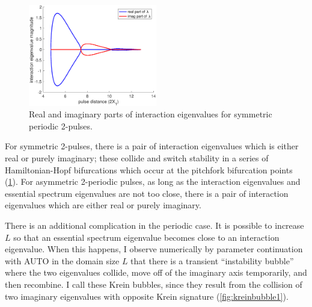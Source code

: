 \documentclass[12pt,reqno,oneside]{amsart}
\theoremstyle{definition}
\theoremstyle{remark}
\begin{document}
\begin{figure}
\includegraphics[width=0.5\textwidth]{images/periodicequaleigbif}
\caption{Real and imaginary parts of interaction eigenvalues for symmetric periodic 2-pulses.}
\label{fig:periodicequaleigbif}
\end{figure}
For symmetric 2-pulses, there is a pair of interaction eigenvalues which is either real or purely imaginary; these collide and switch stability in a series of Hamiltonian-Hopf bifurcations which occur at the pitchfork bifurcation points (\cref{fig:periodicequaleigbif}). For asymmetric 2-periodic pulses, as long as the interaction eigenvalues and essential spectrum eigenvalues are not too close, there is a pair of interaction eigenvalues which are either real or purely imaginary. 

There is an additional complication in the periodic case. It is possible to increase $L$ so that an essential spectrum eigenvalue becomes close to an interaction eigenvalue. When this happens, I observe numerically by parameter continuation with AUTO in the domain size $L$ that there is a transient ``instability bubble'' where the two eigenvalues collide, move off of the imaginary axis temporarily, and then recombine. I call these Krein bubbles, since they result from the collision of two imaginary eigenvalues with opposite Krein signature (\cref{fig:kreinbubble1}).
\end{document}
